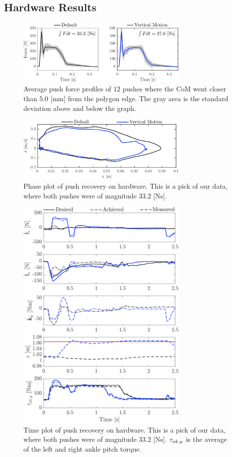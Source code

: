 \documentclass[letterpaper, 10 pt, conference]{ieeeconf}  %
\begin{document}
\subsection{Hardware Results}
\begin{figure}
      \centering
      \includegraphics[width=3.3in]{impulsecompare.png}
      \caption{Average push force profiles of $12$ pushes where the CoM went closer than $5.0$ [mm] from the polygon edge. The gray area is the standard deviation above and below the graph. }
      \label{fig:impulsecompare}
\end{figure}
\begin{figure}
      \centering
      \includegraphics[width=3.3in]{valcomparephaseHW.png}
      \caption{Phase plot of push recovery on hardware. This is a pick of our data, where both pushes were of magnitude $33.2$ [Ns]. }
      \label{fig:valcomparephaseHW}
\end{figure}
\begin{figure}[h]
      \centering
      \includegraphics[width=3.3in]{valcomparetimeHW.png}
      \caption{Time plot of push recovery on hardware. This is a pick of our data, where both pushes were of magnitude $33.2$ [Ns]. $\boldmath{\tau}_{ak,y}$ is the average of the left and right ankle pitch torque.}
      \label{fig:valcomparetimeHW}
\end{figure}
\end{document}
